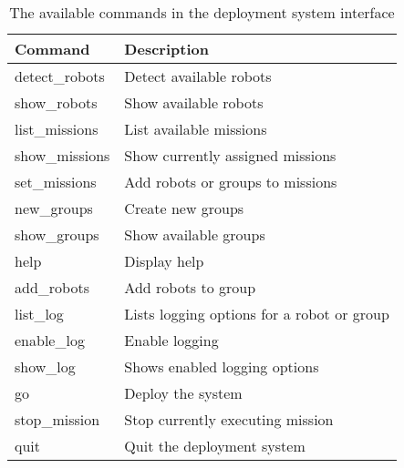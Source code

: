     \begin{table}
    \begin{center}
    \caption{The available commands in the deployment system interface}
    \label{tab:dep_cmds}
    \begin{tabular}{|l|l|}
    \hline
      Command & Description \\
    \hline
      detect\_robots & Detect available robots \\
      show\_robots   & Show available robots \\
      list\_missions & List available missions \\
      show\_missions & Show currently assigned missions\\
      set\_missions  & Add robots or groups to missions\\
      new\_groups    & Create new groups \\
      show\_groups   & Show available groups \\
      help           & Display help \\
      add\_robots    & Add robots to group \\
      list\_log      & Lists logging options for a robot or group\\
      enable\_log    & Enable logging \\
      show\_log      & Shows enabled logging options \\
      go             & Deploy the system \\
      stop\_mission  & Stop currently executing mission \\
      quit           & Quit the deployment system\\
    \hline
    \end{tabular}
    \end{center}
    \end{table}

